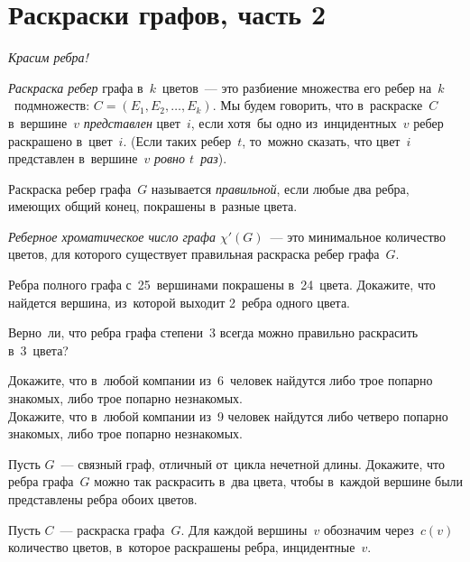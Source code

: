 

\section*{Раскраски графов, часть 2}


\emph{Красим ребра!}

\emph{Раскраска ребер} графа в~$k$~цветов~---
это разбиение множества его ребер на~$k$~подмножеств:
$C = (E_1, E_2, \ldots, E_k)$.
Мы будем говорить, что в~раскраске~$C$
в~вершине~$v$ \emph{представлен} цвет~$i$,
если хотя~бы одно из~инцидентных~$v$ ребер раскрашено в~цвет~$i$.
(Если таких ребер~$t$, то~можно сказать, что
цвет~$i$ представлен в~вершине~$v$ \emph{ровно $t$~раз}).

Раскраска ребер графа~$G$ называется
\emph{правильной},
если любые два ребра, имеющих общий конец, покрашены в~разные цвета.

\emph{Реберное хроматическое число графа $\chi'(G)$}~---
это минимальное количество цветов, для которого существует правильная раскраска
ребер графа~$G$.

\begin{problems}

\item
Ребра полного графа с~25~вершинами покрашены в~24~цвета.
Докажите, что найдется вершина, из~которой выходит 2~ребра одного цвета.

\item
Верно~ли, что ребра графа степени~3 всегда можно правильно раскрасить
в~3~цвета?

\item
\sbp
Докажите, что в~любой компании из~6~человек найдутся либо трое попарно
знакомых, либо трое попарно незнакомых.
\\
\sbp
Докажите, что в~любой компании из~9 человек найдутся либо четверо попарно
знакомых, либо трое попарно незнакомых.

\item
Пусть $G$~--- связный граф, отличный от~цикла нечетной длины.
Докажите, что ребра графа~$G$ можно так раскрасить в~два цвета, чтобы в~каждой
вершине были представлены ребра обоих цветов.

\end{problems}

Пусть $C$~--- раскраска графа~$G$.
Для каждой вершины~$v$ обозначим через~$c(v)$ количество цветов, в~которое
раскрашены ребра, инцидентные~$v$.


